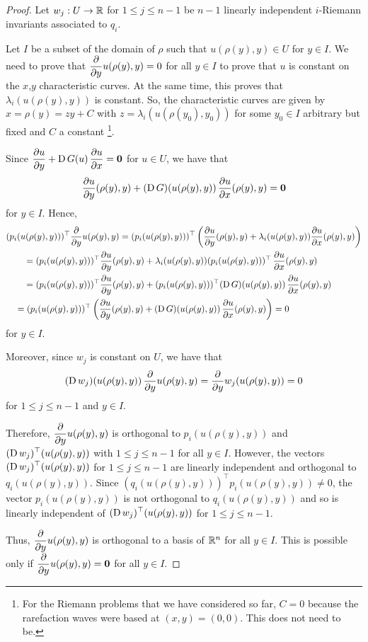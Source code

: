 \begin{proof}
Let $w_j:U \to \RR$ for $1 \leq j \leq n-1$ be $n-1$ linearly
independent $i$-Riemann invariants associated to $q_i$.

Let $I$ be a subset of the domain of $\rho$ such that $u(\rho(y),y) \in U$
for $y \in I$.  We need to prove that
$\displaystyle \pdfdx{u(\rho(y),y)}{y} = 0$ for all $y \in I$
to prove that $u$ is constant on the $x$,$y$ characteristic
curves.  At the same time, this proves that $\lambda_i(u(\rho(y),y))$
is constant.  So, the characteristic curves are given by
$x = \rho(y) = z y + C$ with $z=\lambda_i(u(\rho(y_0),y_0))$ for some
$y_0\in I$ arbitrary but fixed and $C$ a
constant \footnote{For the Riemann problems that we have considered so
far, $C=0$ because the rarefaction waves were based at $(x,y) = (0,0)$.
This does not need to be.}.

Since
$\displaystyle \pdydx{u}{y} + \diff G(u) \, \pdydx{u}{x} = \VEC{0}$
for $u \in U$, we have that
\[
  \pdydx{u}{y}(\rho(y),y) + (\diff G)(u(\rho(y),y))
  \, \pdydx{u}{x}(\rho(y),y) = \VEC{0}
\]
for $y \in I$.  Hence,
\begin{align*}
&(p_i(u(\rho(y),y)))^\top \pdfdx{u(\rho(y),y)}{y}
= (p_i(u(\rho(y),y)))^\top \left(\pdydx{u}{y}(\rho(y),y)
+ \lambda_i(u(\rho(y),y)) \pdydx{u}{x}(\rho(y),y)  \right) \\
&\qquad = (p_i(u(\rho(y),y)))^\top \pdydx{u}{y}(\rho(y),y)
+ \lambda_i(u(\rho(y),y)) (p_i(u(\rho(y),y)))^\top \, \pdydx{u}{x}(\rho(y),y) \\
&\qquad = (p_i(u(\rho(y),y)))^\top \pdydx{u}{y}(\rho(y),y)
+ (p_i(u(\rho(y),y)))^\top (\diff G)(u(\rho(y),y)) \, \pdydx{u}{x}(\rho(y),y) \\
&\quad = (p_i(u(\rho(y),y)))^\top  \left( \pdydx{u}{y}(\rho(y),y)
+ (\diff G)(u(\rho(y),y)) \, \pdydx{u}{x}(\rho(y),y) \right) = 0
\end{align*}
for $y \in I$.

Moreover, since $w_j$ is constant on $U$, we have that
\[
(\diff w_j)(u(\rho(y),y)) \, \pdfdx{u(\rho(y),y)}{y}
  = \pdfdx{w_j(u(\rho(y),y))}{y} = 0
\]
for $1 \leq j \leq n-1$ and $y \in I$.

Therefore, $\displaystyle \pdfdx{u(\rho(y),y)}{y}$ is orthogonal to
$p_i(u(\rho(y),y))$ and $\displaystyle (\diff w_j)^\top(u(\rho(y),y))$
with $1 \leq j \leq n-1$ for all $y\in I$.  However, the vectors
$\displaystyle (\diff w_j)^\top(u(\rho(y),y))$ for $1\leq j \leq n-1$ are
linearly independent and orthogonal to $q_i(u(\rho(y),y))$.  Since
$\displaystyle (q_i(u(\rho(y),y)))^\top p_i(u(\rho(y),y)) \neq 0$, the vector
$p_i(u(\rho(y),y))$ is not orthogonal to $q_i(u(\rho(y),y))$
and so is linearly independent of
$\displaystyle (\diff w_j)^\top(u(\rho(y),y))$ for $1\leq j \leq n-1$.

Thus, $\displaystyle \pdfdx{u(\rho(y),y)}{y}$ is orthogonal to
a basis of $\RR^n$ for all $y\in I$.  This is possible only if
$\displaystyle \pdfdx{u(\rho(y),y)}{y} = \VEC{0}$
for all $y\in I$.
\end{proof}

